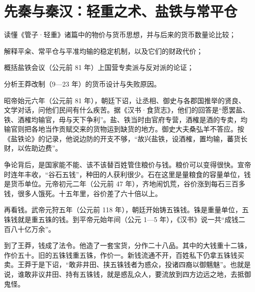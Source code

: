 \chapter{先秦与秦汉：轻重之术、盐铁与常平仓}\label{ch:qinhan}

\begin{chapterguide}
\begin{guidegoals}
\item 读懂《管子·轻重》诸篇中的物价与货币思想，并与后来的货币数量论比较；
\item 解释平籴、常平仓与平准均输的稳定机制，以及它们的财政代价；
\item 概括盐铁会议（公元前 81 年）上国营专卖派与反对派的论证；
\item 分析王莽改制（9—23 年）的货币设计与失败原因。
\end{guidegoals}
\end{chapterguide}

昭帝始元六年（公元前 81 年），朝廷下诏，让丞相、御史与各郡国推举的贤良、文学对话，问他们民间有什么疾苦\cite{yantielun}。据《汉书·食货志》，他们的回答是“愿罢盐、铁、酒榷均输官，毋与天下争利”\cite{hanshu}。盐、铁当时由官府专营，酒榷是酒的专卖，均输官则把各地当作贡赋交来的货物运到缺货的地方。御史大夫桑弘羊不答应。按《盐铁论》的记录，他说边防的开支不够，“故兴盐铁，设酒榷，置均输，蕃货长财，以佐助边费”\cite{yantielun}。

争论背后，是国家能不能、该不该替百姓管住粮价与钱。粮价可以变得很快。宣帝时连年丰收，“谷石五钱”，种田的人获利很少。石在这里是量粮食的容量单位，钱是货币单位。元帝初元二年（公元前 47 年），齐地闹饥荒，谷价涨到每石三百多钱，很多人饿死\cite{hanshu}。十五年里，谷价差了六十倍以上。

再看钱。武帝元狩五年（公元前 118 年），朝廷开始铸五铢钱。铢是重量单位，五铢钱就是重五铢的钱。到平帝元始年间（公元 1—5 年），《汉书》说一共“成钱二百八十亿万余”\cite{hanshu}。

到了王莽，钱成了法令。他造了一套宝货，分作二十八品。其中的大钱重十二铢，作价五十。旧的五铢钱重五铢，作价一。新钱流通不开，百姓私下仍拿五铢钱买卖。王莽于是下诏，“敢非井田、挟五铢钱者为惑众，投诸四裔以御魑魅”\cite{hanshu}。也就是说，谁敢非议井田、持有五铢钱，就是惑乱众人，要流放到四方边远之地，去抵御鬼怪。

